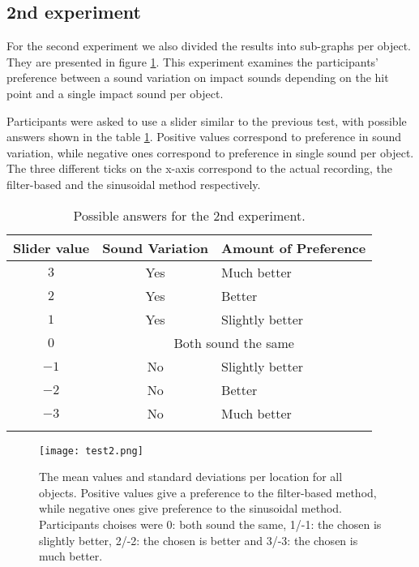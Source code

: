 
\subsection{2nd experiment}
For the second experiment we also divided the results into sub-graphs per object. They are presented in figure \ref{fig:test2}. This experiment examines the participants' preference between a sound variation on impact sounds depending on the hit point and a single impact sound per object.

Participants were asked to use a slider similar to the previous test, with possible answers shown in the table \ref{tab:test2_ans}. Positive values correspond to preference in sound variation, while negative ones correspond to preference in single sound per object. The three different ticks on the x-axis correspond to the actual recording, the filter-based and the sinusoidal method respectively. %

\begin{table}[H]
	\centering
    \begin{tabular}{  c  c  l  }
    \toprule
    \textbf{Slider value} & \textbf{Sound Variation} & \textbf{Amount of Preference} \\ \toprule
    \addlinespace
    $3$ & Yes & Much better \\ 
    $2$ & Yes & Better \\ 
    $1$ & Yes & Slightly better \\ 
    \addlinespace
    $0$ & \multicolumn{2}{c}{Both sound the same} \\ 
    \addlinespace
    $-1$ & No & Slightly better \\ 
    $-2$ & No & Better \\ 
    $-3$ & No & Much better \\
    \addlinespace
    \bottomrule
    \end{tabular}
    \caption{Possible answers for the 2nd experiment.}
    \label{tab:test2_ans}
\end{table}

\begin{figure}[H]
  \centering
    \texttt{[image: test2.png]}
      \caption{The mean values and standard deviations per location for all objects. Positive values give a preference to the filter-based method, while negative ones give preference to the sinusoidal method. Participants choises were 0: both sound the same, 1/-1: the chosen is slightly better, 2/-2: the chosen is better and 3/-3: the chosen is much better.}\label{fig:test2}
\end{figure}

